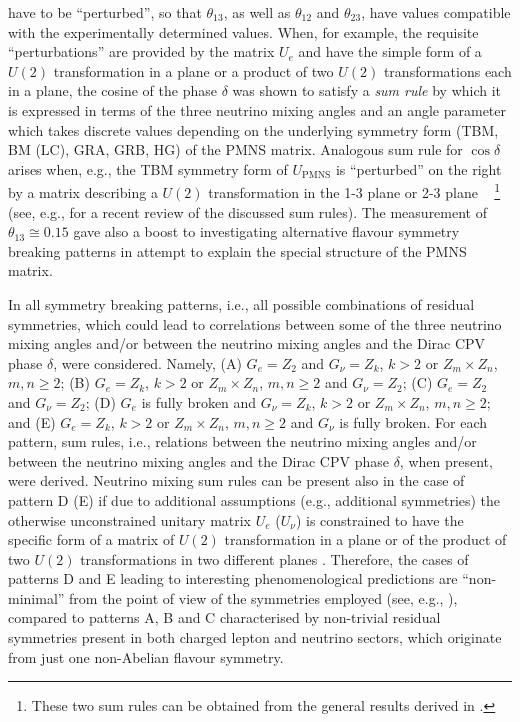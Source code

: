 \documentclass[11pt,a4paper]{article}
\numberwithin{equation}{section}
\begin{document}
have to be ``perturbed'',
so that $\theta_{13}$, as well as $\theta_{12}$ and $\theta_{23}$,
have values compatible with the experimentally determined values.
When, for example, the requisite ``perturbations'' are provided by the matrix 
$U_e$ and have the simple form of
a $U(2)$ transformation in a plane or a product of two
$U(2)$ transformations each in a plane, 
the cosine of the phase $\delta$ was shown 
\cite{Petcov:2014laa,Girardi:2015vha}
to satisfy a \textit{sum rule} by which it is expressed in terms 
of the three neutrino mixing angles and an angle parameter 
which takes discrete values depending on the 
underlying symmetry form (TBM, BM (LC), GRA, GRB, HG) of the PMNS matrix.
Analogous sum rule for $\cos\delta$ arises when, e.g., 
the TBM symmetry form of $U_\mathrm{PMNS}$ is ``perturbed'' 
on the right by a matrix describing a $U(2)$ transformation in the 
1-3 plane \cite{Grimus:2008tt} or 2-3 plane \cite{Albright:2008rp}~%
\footnote{These two sum rules can be obtained from the general 
results derived in  \cite{Girardi:2015rwa}.} 
(see, e.g., \cite{Petcov:2017ggy} for a recent review of 
the discussed sum rules). The measurement of $\theta_{13}\cong 0.15$
gave also a boost to investigating alternative
flavour symmetry breaking patterns 
in attempt to explain the special 
structure of the PMNS matrix.

 In \cite{Girardi:2015rwa} all symmetry breaking patterns, 
i.e., all possible combinations 
of residual symmetries, which could lead to 
correlations between some of  
the three neutrino mixing angles and/or between the neutrino mixing angles 
and the Dirac CPV phase $\delta$, were considered.
Namely, 
(A) $G_e = Z_2$ and $G_{\nu} = Z_k$, $k > 2$ or $Z_m \times Z_n$, $m,n \geq 2$; 
(B) $G_e = Z_k$, $k > 2$ or $Z_m \times Z_n$, $m,n \geq 2$ and $G_{\nu} = Z_2$;
(C) $G_e = Z_2$ and $G_{\nu} = Z_2$;
(D) $G_e$ is fully broken and $G_{\nu} = Z_k$, $k > 2$ or $Z_m \times Z_n$, $m,n \geq 2$; 
and (E) $G_e = Z_k$, $k > 2$ or $Z_m \times Z_n$, $m,n \geq 2$ and $G_{\nu}$ is fully broken.
For each pattern, sum rules, i.e., 
relations between the neutrino mixing angles and/or between 
the neutrino mixing angles and the Dirac CPV phase $\delta$, when present,
were derived.
Neutrino mixing sum rules can be present also 
in the case of pattern D (E) if due to additional
assumptions (e.g., additional symmetries)
the otherwise unconstrained unitary
matrix $U_e$ ($U_\nu$) is
constrained to have the specific form of
a matrix of $U(2)$ transformation in a plane or
of the product of two $U(2)$ transformations
in two different planes
\cite{Petcov:2014laa,Girardi:2015vha,Girardi:2015rwa,Marzocca:2013cr,Girardi:2014faa}.
Therefore, the cases of patterns D and E
leading to interesting phenomenological predictions
are ``non-minimal'' from the point
of view of the symmetries employed
(see, e.g., \cite{Meroni:2012ty,Hagedorn:2012pg,Antusch:2013kna,Chen:2013wba,
Girardi:2013sza,Gehrlein:2014wda}), 
compared to patterns A, B and C characterised by 
non-trivial residual symmetries present in both 
charged lepton and neutrino sectors, which originate
from just one non-Abelian flavour symmetry.
\end{document}
